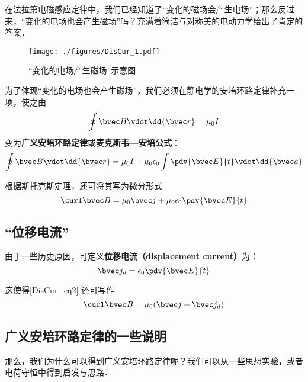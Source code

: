 
\begin{issues}
\issueDraft
\end{issues}


在法拉第电磁感应定律中，我们已经知道了“变化的磁场会产生电场”；那么反过来，“变化的电场也会产生磁场”吗？充满着简洁与对称美的电动力学给出了肯定的答案．

\begin{figure}[ht]
\centering
\texttt{[image: ./figures/DisCur\_1.pdf]}
\caption{“变化的电场产生磁场”示意图} \label{DisCur_fig1}
\end{figure}

为了体现“变化的电场也会产生磁场”，我们必须在静电学的安培环路定律补充一项，使之由
\begin{equation}
\oint \bvec B \vdot \dd{\bvec r} = \mu_0 I
\end{equation}
变为\textbf{广义安培环路定律}或\textbf{麦克斯韦—安培公式}：
\begin{equation}
\oint \bvec B \vdot \dd{\bvec r} = \mu_0 I + \mu_0 \epsilon_0 \int \pdv{\bvec E}{t} \vdot \dd{\bvec a}
\end{equation}

根据斯托克斯定理，还可将其写为微分形式
\begin{equation}\label{DisCur_eq2}
\curl \bvec B = \mu_0 \bvec j + \mu_0\epsilon_0 \pdv{\bvec E}{t}
\end{equation}

\subsection{“位移电流”}
由于一些历史原因，可定义\textbf{位移电流（displacement current）}为：
\begin{equation}
\bvec j_d = \epsilon_0 \pdv{\bvec E}{t}
\end{equation}

这使得\autoref{DisCur_eq2} 还可写作
\begin{equation}
\curl \bvec B = \mu_0 (\bvec j + \bvec j_d)
\end{equation}

\subsection{广义安培环路定律的一些说明}
那么，我们为什么可以得到广义安培环路定律呢？我们可以从一些思想实验，或者电荷守恒中得到启发与思路．


